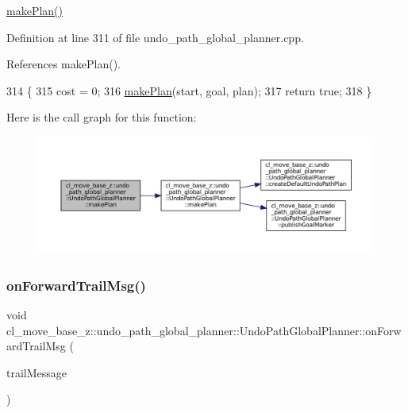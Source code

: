 \hyperlink{classcl__move__base__z_1_1undo__path__global__planner_1_1UndoPathGlobalPlanner_a46034d27c0811abae440009457a7f8b0}{make\+Plan()} 

Definition at line 311 of file undo\+\_\+path\+\_\+global\+\_\+planner.\+cpp.



References make\+Plan().


\begin{DoxyCode}
314         \{
315             cost = 0;
316             \hyperlink{classcl__move__base__z_1_1undo__path__global__planner_1_1UndoPathGlobalPlanner_a46034d27c0811abae440009457a7f8b0}{makePlan}(start, goal, plan);
317             \textcolor{keywordflow}{return} \textcolor{keyword}{true};
318         \}
\end{DoxyCode}
Here is the call graph for this function\+:
\nopagebreak
\begin{figure}[H]
\begin{center}
\leavevmode
\includegraphics[width=350pt]{classcl__move__base__z_1_1undo__path__global__planner_1_1UndoPathGlobalPlanner_aca09f640e4bda4d5ccc9613276fd3f71_cgraph}
\end{center}
\end{figure}
\mbox{\label{classcl__move__base__z_1_1undo__path__global__planner_1_1UndoPathGlobalPlanner_ae5e3c5922ceb8783a6a01d904fc9c230}} 
\subsubsection{\texorpdfstring{on\+Forward\+Trail\+Msg()}{onForwardTrailMsg()}}
{\footnotesize\ttfamily void cl\+\_\+move\+\_\+base\+\_\+z\+::undo\+\_\+path\+\_\+global\+\_\+planner\+::\+Undo\+Path\+Global\+Planner\+::on\+Forward\+Trail\+Msg (\begin{DoxyParamCaption}\item[{const nav\+\_\+msgs\+::\+Path\+::\+Const\+Ptr \&}]{trail\+Message }\end{DoxyParamCaption})\hspace{0.3cm}{\ttfamily [private]}}

